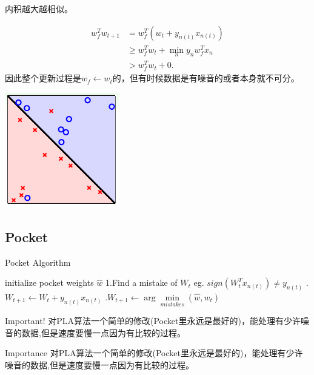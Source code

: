 \documentclass{article}
\begin{document}
内积越大越相似。\par
\begin{align*}
w_f^{T}w_{t+1} &= w_f^{T}(w_t + y_{n(t)}x_{n(t)}) \\
               &\geq w_f^{T}w_t + \underset{n}{\min}y_nw_f^Tx_n \\
               &> w_f^Tw_t + 0.
\end{align*}
因此整个更新过程是$w_f \gets w_t$的，但有时候数据是有噪音的或者本身就不可分。 \par
\begin{center}
\includegraphics[width=5cm, height=5cm]{lecture2_3}\\
\end{center}
\subsection{Pocket}
\begin{algorithm}  
\caption{Pocket Algorithm}  
\begin{algorithmic}  
\STATE initialize pocket weights $\hat{w}$
  \STATE 1.Find a \textcolor{Mycolor1}{mistake} of $W_t$
  \STATE eg. $sign(W_{t}^{T}x_{n(t)}) \neq y_{n(t)}$ 
  .$W_{t+1} \gets W_{t} + y_{n(t)}x_{n(t)}$ 
  .$W_{t+1} \gets \arg\underset{mistakes}{\min}(\hat{w},w_t)$
\ENDFOR
\end{algorithmic}  
\end{algorithm}
\par
\begin{bclogo}{Important!}
对PLA算法一个简单的修改(Pocket里永远是最好的)，能处理有少许噪音的数据,但是速度要慢一点因为有比较的过程。 \par
\end{bclogo}
\begin{myremark}{Importance}
对PLA算法一个简单的修改(Pocket里永远是最好的)，能处理有少许噪音的数据,但是速度要慢一点因为有比较的过程。 \par
\end{myremark}
\end{document}
